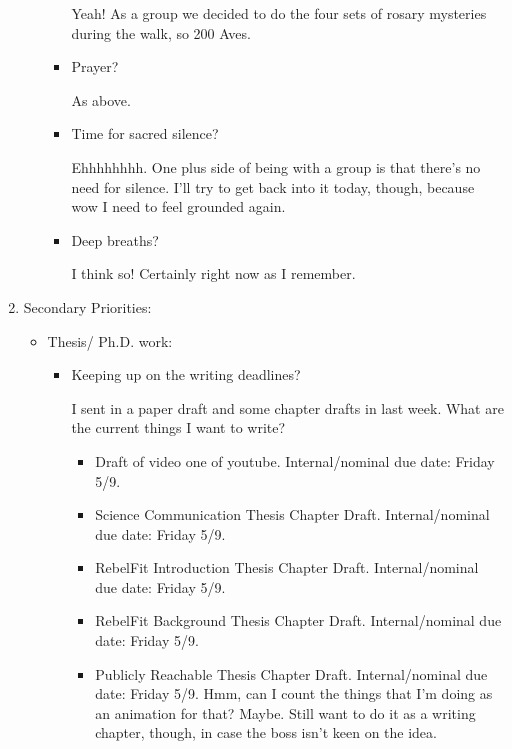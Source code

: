 \documentclass[12pt]{article}
\renewcommand{\,}{\textsuperscript{,}}
\begin{document}
\begin{enumerate}
\begin{itemize}
\begin{itemize}
Yeah! As a group we decided to do the four sets of rosary mysteries during the walk, so 200 Aves.

\item Prayer?

As above.

\item Time for sacred silence?

Ehhhhhhhh. One plus side of being with a group is that there's no need for silence.  
I'll try to get back into it today, though, because wow I need to feel grounded again.

\item Deep breaths?

I think so! Certainly right now as I remember.

\end{itemize}

\end{itemize}

\item Secondary Priorities:

\begin{itemize}

\item Thesis/ Ph.D. work:

\begin{itemize}

\item Keeping up on the writing deadlines?

I sent in a paper draft and some chapter drafts in last week.  
What are the current things I want to write?

\begin{itemize}

\item Draft of video one of youtube. Internal/nominal due date: Friday 5/9.

\item Science Communication Thesis Chapter Draft. Internal/nominal due date: Friday 5/9.

\item RebelFit Introduction Thesis Chapter Draft. Internal/nominal due date: Friday 5/9.

\item RebelFit Background Thesis Chapter Draft. Internal/nominal due date: Friday 5/9.

\item Publicly Reachable Thesis Chapter Draft. Internal/nominal due date: Friday 5/9. Hmm, can I count the things that I'm doing as an animation for that?  
Maybe.  
Still want to do it as a writing chapter, though, in case the boss isn't keen on the idea.


\end{itemize}
\end{itemize}
\end{itemize}
\end{enumerate}
\end{document}
